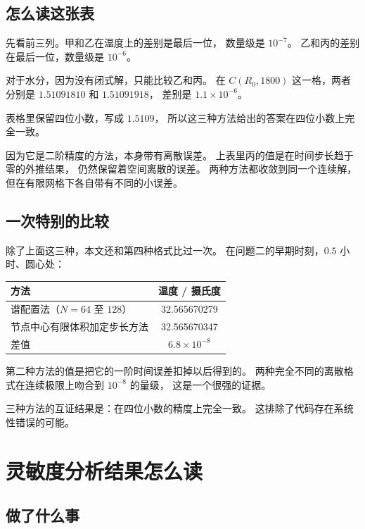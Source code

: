 \subsection{怎么读这张表}

先看前三列。甲和乙在温度上的差别是最后一位，
数量级是 $10^{-7}$。
乙和丙的差别在最后一位，数量级是 $10^{-6}$。

对于水分，因为没有闭式解，只能比较乙和丙。
在 $C(R_0,1800)$ 这一格，两者分别是
$1.51091810$ 和 $1.51091918$，
差别是 $1.1\times10^{-6}$。

表格里保留四位小数，写成 $1.5109$，
所以这三种方法给出的答案在四位小数上完全一致。

因为它是二阶精度的方法，本身带有离散误差。
上表里丙的值是在时间步长趋于零的外推结果，
仍然保留着空间离散的误差。
两种方法都收敛到同一个连续解，
但在有限网格下各自带有不同的小误差。

\subsection{一次特别的比较}

除了上面这三种，本文还和第四种格式比过一次。
在问题二的早期时刻，$0.5$ 小时、圆心处：

\begin{center}
\begin{tabular}{@{}lc@{}}
\toprule
方法 & 温度 / 摄氏度 \\
\midrule
谱配置法（$N=64$ 至 $128$） & 32.565670279 \\
节点中心有限体积加定步长方法 & 32.565670347 \\
\midrule
差值 & $6.8\times10^{-8}$ \\
\bottomrule
\end{tabular}
\end{center}

第二种方法的值是把它的一阶时间误差扣掉以后得到的。
两种完全不同的离散格式在连续极限上吻合到 $10^{-8}$ 的量级，
这是一个很强的证据。

\keypoint
三种方法的互证结果是：在四位小数的精度上完全一致。
这排除了代码存在系统性错误的可能。

\section{灵敏度分析结果怎么读}

\subsection{做了什么事}

